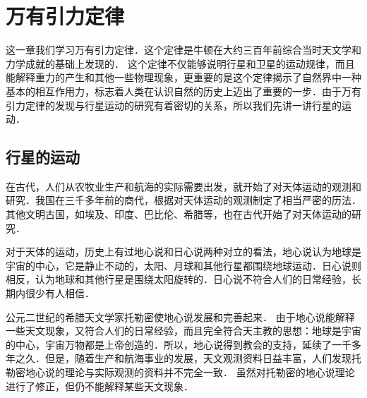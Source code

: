 \chapter{万有引力定律}\label{chapter-law-of-universal-gravitation}

这一章我们学习万有引力定律．这个定律是牛顿在大约三百年前综合当时天文学和力学成就的基础上发现的．
这个定律不仅能够说明行星和卫星的运动规律，而且能解释重力的产生和其他一些物理现象，更重要的是这个定律揭示了自然界中一种基本的相互作用力，标志着人类在认识自然的历史上迈出了重要的一步．由于万有引力定律的发现与行星运动的研究有着密切的关系，所以我们先讲一讲行星的运动．

\section{行星的运动}
在古代，人们从农牧业生产和航海的实际需要出发，就开始了对天体运动的观测和研究．我国在三千多年前的商代，根据对天体运动的观测制定了相当严密的历法．其他文明古国，如埃及、印度、巴比伦、希腊等，也在古代开始了对天体运动的研究．

对于天体的运动，历史上有过地心说和日心说两种对立的看法，地心说认为地球是宇宙的中心，它是静止不动的，太阳、月球和其他行星都围绕地球运动．日心说则相反，认为地球和其他行星是围绕太阳旋转的．日心说不符合人们的日常经验，长期内很少有人相信．	
	
公元二世纪的希腊天文学家托勒密使地心说发展和完善起来．
由于地心说能解释一些天文现象，又符合人们的日常经验，而且完全符合天主教的思想：地球是宇宙的中心，宇宙万物都是上帝创造的．所以，地心说得到教会的支持，延续了一千多年之久．但是，随着生产和航海事业的发展，天文观测资料日益丰富，人们发现托勒密地心说的理论与实际观测的资料并不完全一致．
虽然对托勒密的地心说理论进行了修正，但仍不能解释某些天文现象．


